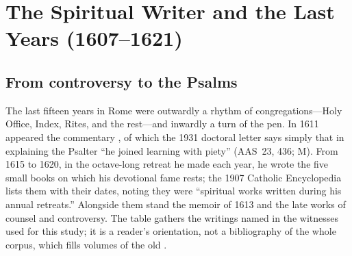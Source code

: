 \section{The Spiritual Writer and the Last Years (1607--1621)}

\subsection{From controversy to the Psalms}

The last fifteen years in Rome were outwardly a rhythm of
congregations---Holy Office, Index, Rites, and the rest---and
inwardly a turn of the pen. In 1611 appeared the commentary
, of which the 1931
doctoral letter says simply that in explaining the Psalter ``he
joined learning with piety'' (AAS~23, 436; M). From 1615 to 1620,
in the octave-long retreat he made each year, he wrote the five
small books on which his devotional fame rests; the 1907 Catholic
Encyclopedia lists them with their dates, noting they were
``spiritual works written during his annual retreats.'' Alongside
them stand the memoir of 1613 and the late works of counsel and
controversy. The table gathers the writings named in the witnesses
used for this study; it is a reader's orientation, not a
bibliography of the whole corpus, which fills volumes of the old
.

